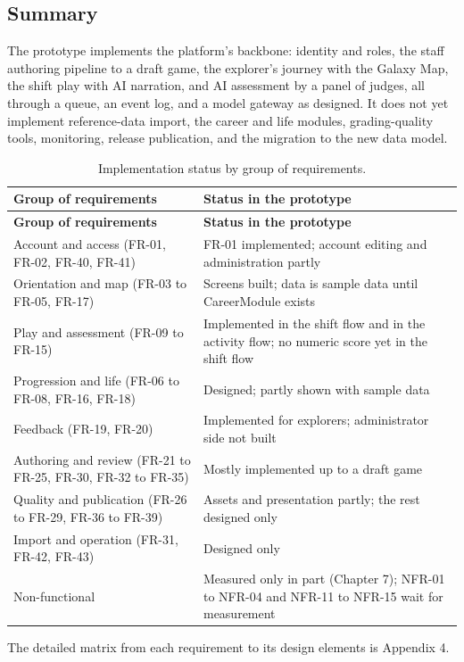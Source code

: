 \subsection{Summary}

The prototype implements the platform's backbone: identity and roles, the staff authoring pipeline to a draft game, the explorer's journey with the Galaxy Map, the shift play with AI narration, and AI assessment by a panel of judges, all through a queue, an event log, and a model gateway as designed. It does not yet implement reference-\allowbreak{}data import, the career and life modules, grading-\allowbreak{}quality tools, monitoring, release publication, and the migration to the new data model.

{\small{}\renewcommand{\arraystretch}{1.1}
\begin{longtable}{|>{\raggedright\arraybackslash}p{}|>{\raggedright\arraybackslash}p{}|}
\caption{Implementation status by group of requirements.} \\
\hline
\textbf{Group of requirements} & \textbf{Status in the prototype} \\ \hline
\endfirsthead
\hline
\textbf{Group of requirements} & \textbf{Status in the prototype} \\ \hline
\endhead
Account and access (FR-01, FR-02, FR-40, FR-41) & FR-01 implemented; account editing and administration partly \\ \hline
Orientation and map (FR-03 to FR-05, FR-17) & Screens built; data is sample data until CareerModule exists \\ \hline
Play and assessment (FR-09 to FR-15) & Implemented in the shift flow and in the activity flow; no numeric score yet in the shift flow \\ \hline
Progression and life (FR-06 to FR-08, FR-16, FR-18) & Designed; partly shown with sample data \\ \hline
Feedback (FR-19, FR-20) & Implemented for explorers; administrator side not built \\ \hline
Authoring and review (FR-21 to FR-25, FR-30, FR-32 to FR-35) & Mostly implemented up to a draft game \\ \hline
Quality and publication (FR-26 to FR-29, FR-36 to FR-39) & Assets and presentation partly; the rest designed only \\ \hline
Import and operation (FR-31, FR-42, FR-43) & Designed only \\ \hline
Non-\allowbreak{}functional & Measured only in part (Chapter 7); NFR-01 to NFR-04 and NFR-11 to NFR-15 wait for measurement \\ \hline
\end{longtable}
}

The detailed matrix from each requirement to its design elements is Appendix 4.
